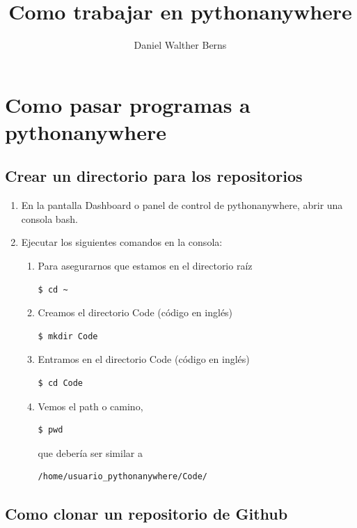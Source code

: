 \documentclass[10pt,a4paper]{article}
\author{Daniel Walther Berns}
\title{Como trabajar en pythonanywhere}
\begin{document}
\section{Como pasar programas a pythonanywhere}

\subsection{Crear un directorio para los repositorios}

\begin{enumerate}
	\item En la pantalla Dashboard o panel de control de pythonanywhere, abrir una consola bash.
	\item Ejecutar los siguientes comandos en la consola:
	\begin{enumerate}
		\item Para asegurarnos que estamos en el directorio raíz
		\begin{verbatim}
$ cd ~
		\end{verbatim}
	    \item Creamos el directorio Code (código en inglés)
	    \begin{verbatim}
$ mkdir Code
	    \end{verbatim}
	    \item Entramos en el directorio Code (código en inglés)
        \begin{verbatim}
$ cd Code
        \end{verbatim}
    \item Vemos el path o camino,
\begin{verbatim}
$ pwd
\end{verbatim}
que debería ser similar a
\begin{verbatim}
/home/usuario_pythonanywhere/Code/
\end{verbatim}    

	\end{enumerate}
\end{enumerate}

\subsection{Como clonar un repositorio de Github}
\end{document}
